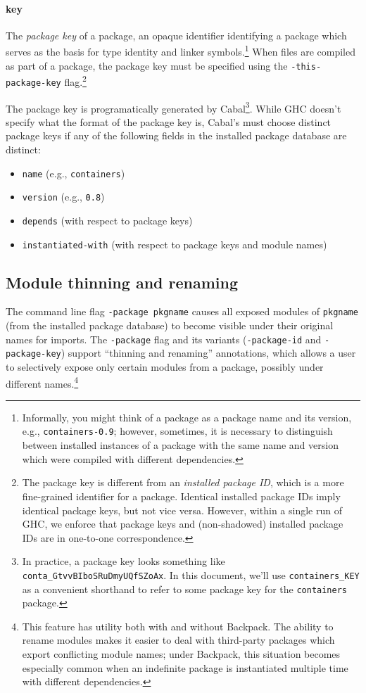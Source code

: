 \documentclass{article}
\begin{document}
\paragraph{key} The \emph{package key} of a
package, an opaque identifier identifying a package
which serves as the basis for type identity and linker
symbols.\footnote{Informally, you might think of a package as a package
name and its version, e.g., \texttt{containers-0.9}; however, sometimes,
it is necessary to distinguish between installed instances of a package
with the same name and version which were compiled with different
dependencies.} When files are compiled as part of a package, the
package key must be specified using the \texttt{-this-package-key}
flag.\footnote{The package key is different from an
\emph{installed package ID}, which is a more fine-grained identifier for
a package.  Identical installed package IDs imply identical package
keys, but not vice versa.  However, within a single run of GHC, we
enforce that package keys and (non-shadowed) installed package IDs are
in one-to-one correspondence.}

The package key is programatically generated by Cabal\footnote{In
practice, a package key looks something like
\texttt{conta\_GtvvBIboSRuDmyUQfSZoAx}.  In this document, we'll use
\texttt{containers\_KEY} as a convenient shorthand to refer to some
package key for the \texttt{containers} package.}. While GHC doesn't
specify what the format of the package key is,  Cabal's must choose distinct package keys if
any of the following fields in the installed package database are
distinct:

\begin{itemize}
\item \texttt{name} (e.g., \texttt{containers})
\item \texttt{version} (e.g., \texttt{0.8})
\item \texttt{depends} (with respect to package keys)
\item \texttt{instantiated-with} (with respect to package keys and module names)
\end{itemize}

\subsection{Module thinning and renaming}

The command line flag \texttt{-package pkgname} causes all
exposed modules of \texttt{pkgname} (from the installed package database) to become visible under their
original names for imports.
The \texttt{-package} flag and its variants (\texttt{-package-id} and
\texttt{-package-key}) support ``thinning and renaming''
annotations, which allows a user to selectively expose only certain
modules from a package, possibly under different names.\footnote{This
feature has utility both with and without Backpack.  The ability to
rename modules makes it easier to deal with third-party packages which
export conflicting module names; under Backpack, this situation becomes
especially common when an indefinite package is instantiated multiple
time with different dependencies.}
\end{document}
